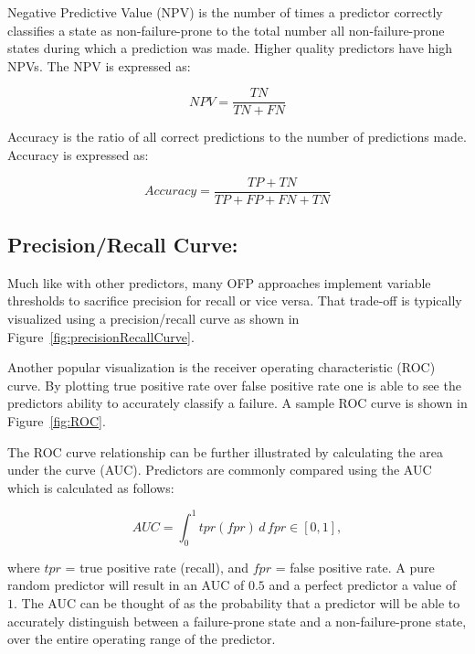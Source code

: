 Negative Predictive Value (NPV) is the number of times a predictor correctly
classifies a state as non-failure-prone to the total number all
non-failure-prone states during which a prediction was made.  Higher quality
predictors have high NPVs.  The NPV is expressed as:

\[ \mathit{NPV}
	= \dfrac{TN}{TN + FN}
\]

Accuracy is the ratio of all correct predictions to the number of predictions
made.  Accuracy is expressed as:

\[ Accuracy 
	= \dfrac{TP + TN}{TP + FP + FN + TN}
\]

\subsection{Precision/Recall Curve:}
Much like with other predictors, many OFP approaches implement variable
thresholds to sacrifice precision for recall or vice versa.  That trade-off is
typically visualized using a precision/recall curve as shown in
Figure~\ref{fig:precisionRecallCurve}.

\figprecisionRecallCurve

Another popular visualization is the receiver operating characteristic (ROC)
curve.  By plotting true positive rate over false positive rate one is able to
see the predictors ability to accurately classify a failure.  A sample ROC
curve is shown in Figure~\ref{fig:ROC}.

\figROC

The ROC curve relationship can be further illustrated by calculating the area
under the curve (AUC).  Predictors are commonly compared using the AUC which is
calculated as follows:

$$AUC = \int_{0}^{1} \mathit{tpr}(\mathit{fpr}) \,d\,\mathit{fpr} \in [0,1],$$

\noindent
where $tpr$ = true positive rate (recall), and $fpr$ = false positive rate.  A
pure random predictor will result in an AUC of $0.5$ and a perfect predictor a
value of~$1$.  The AUC can be thought of as the probability that a predictor
will be able to accurately distinguish between a failure-prone state and a
non-failure-prone state, over the entire operating range of the predictor.

